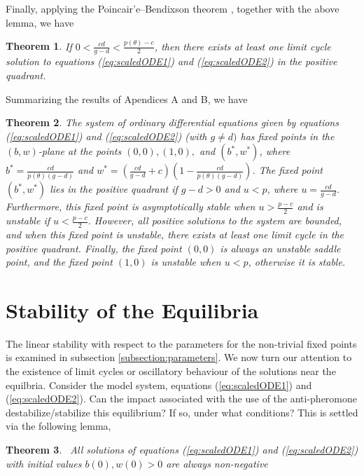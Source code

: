 \documentclass[review,authoryear]{elsarticle}
\newtheorem{theorem}{Theorem}[section]
\begin{document}
Finally, applying the Poincair'e--Bendixson theorem \citep{nonlinearChaos}, together with the above lemma, we have

\begin{theorem}
  If $0 < \frac{cd}{g-d} < \frac{p(\theta) -c}{2}$, then there exists at least one  limit cycle solution to equations (\ref{eq:scaledODE1}) and (\ref{eq:scaledODE2}) in the positive quadrant.
\end{theorem}

Summarizing the results of Apendices A and B, we have

\begin{theorem}
  The system of ordinary differential equations given by equations (\ref{eq:scaledODE1}) and (\ref{eq:scaledODE2}) (with $g\ne d)$ has fixed points in the $(b,w)$-plane at the points $(0,0), (1,0),$ and $(b^*,w^*)$, where $b^*=\frac{cd}{p(\theta)(g-d)}$ and
$w^*=\left(\frac{cd}{g-d}+c\right)\left(1-\frac{cd}{p(\theta)(g-d)}\right)$. 
 The  fixed point $(b^*,w^*)$ lies in the positive quadrant if $g-d>0$ and $u<p$, where $u=\frac{cd}{g-d}.$
Furthermore, this fixed point is asymptotically stable when $u>\frac{p-c}{2}$ and is unstable if $u<\frac{p-c}{2}.$ However, all positive solutions to the system are bounded, and when this fixed point is unstable, there exists at least one  limit cycle in the positive quadrant.
Finally, the fixed point $(0,0)$ is always an unstable saddle point, and the fixed point $(1,0)$ is unstable when $u<p$, otherwise it is stable.
\end{theorem}
\section{Stability of the Equilibria}
\label{appendix:stability}

The linear stability with respect to the parameters for the
non-trivial fixed points is examined in subsection 
\ref{subsection:parameters}. We now turn our attention to the
existence of limit cycles or oscillatory behaviour of the solutions
near the equilbria. Consider the model system, equations
(\ref{eq:scaledODE1}) and (\ref{eq:scaledODE2}). Can the impact
associated with the use of the anti-pheromone destabilize/stabilize
this equilibrium? If so, under what conditions? This is settled via
the following lemma,
\begin{theorem}
  \bigskip\ All solutions of equations (\ref{eq:scaledODE1}) and
  (\ref{eq:scaledODE2}) with initial values
  $b\left( 0\right) ,w\left( 0\right) >0$ are always non-negative
\end{theorem}
\end{document}

